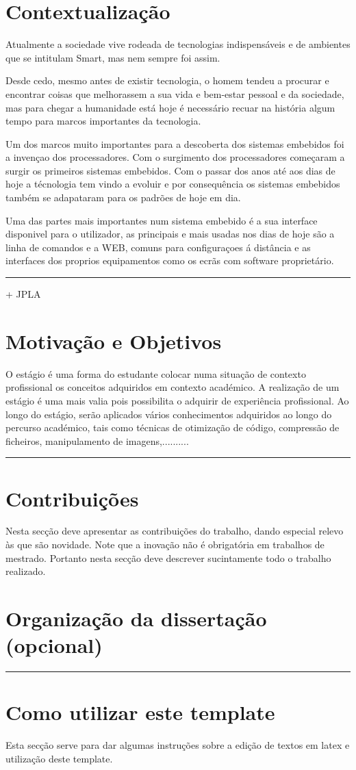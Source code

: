 \section{Contextualização}
Atualmente a sociedade vive rodeada de tecnologias indispensáveis e de ambientes que se intitulam Smart, mas nem sempre foi assim.\par
Desde cedo, mesmo antes de existir tecnologia, o homem tendeu a procurar e encontrar coisas que melhorassem a sua vida e bem-estar pessoal e da sociedade, mas para chegar a humanidade está hoje é necessário recuar na história algum tempo para marcos importantes da tecnologia.\par
Um dos marcos muito importantes para a descoberta  dos sistemas embebidos foi a invençao dos processadores. Com o surgimento dos processadores começaram a surgir os primeiros sistemas embebidos. Com o passar dos anos até aos dias de hoje a técnologia tem vindo a evoluir e por consequência os sistemas embebidos também se adapataram para os padrões de hoje em dia.\par
Uma das partes mais importantes num sistema embebido é a sua interface disponivel para o utilizador, as principais e mais usadas nos dias de hoje são  a linha de comandos e a WEB, comuns para configuraçoes á distância e as interfaces dos proprios equipamentos como os ecrãs com software proprietário.

{\color{red} \rule{\linewidth}{0.5mm} }
+ JPLA

\section{Motivação e Objetivos}
O estágio é uma forma do estudante colocar numa situação de contexto profissional os conceitos adquiridos em contexto académico. A realização de um estágio é uma mais valia pois possibilita o adquirir de experiência profissional. Ao longo do estágio, serão aplicados vários conhecimentos adquiridos ao longo do percurso académico, tais como técnicas de otimização de código, compressão de ficheiros, manipulamento de imagens,..........\par
{\color{red} \rule{\linewidth}{0.5mm} }

\section{Contribuições}
Nesta secção deve apresentar as contribuições do trabalho, dando especial relevo às que são novidade. Note que a inovação não é obrigatória em trabalhos de mestrado. Portanto nesta secção deve descrever sucintamente todo o trabalho realizado.

\section{Organização da dissertação (opcional)}

{\color{red} \rule{\linewidth}{0.5mm} }

\section{Como utilizar este template}
Esta secção serve para dar algumas instruções sobre a edição de textos em latex e utilização deste template.

